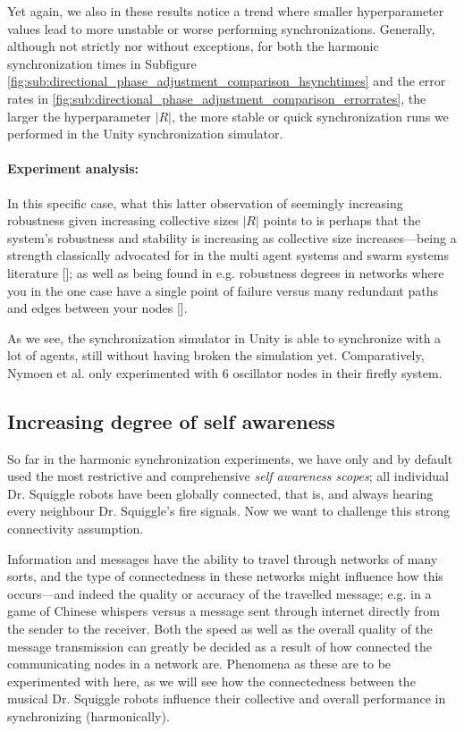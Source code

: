 		Yet again, we also in these results notice a trend where smaller hyperparameter values lead to more unstable or worse performing synchronizations. Generally, although not strictly nor without exceptions, for both the harmonic synchronization times in Subfigure \ref{fig:sub:directional_phase_adjustment_comparison_hsynchtimes} and the error rates in \ref{fig:sub:directional_phase_adjustment_comparison_errorrates}, the larger the hyperparameter $|R|$, the more stable or quick synchronization runs we performed in the Unity synchronization simulator. 
		
		\paragraph{Experiment analysis:\nl}
		
		In this specific case, what this latter observation of seemingly increasing robustness given increasing collective sizes $|R|$ points to is perhaps that the system's robustness and stability is increasing as collective size increases—being a strength classically advocated for in the multi agent systems and swarm systems literature []; as well as being found in e.g. robustness degrees in networks where you in the one case have a single point of failure versus many redundant paths and edges between your nodes [].
		
		As we see, the synchronization simulator in Unity is able to synchronize with a lot of agents, still without having broken the simulation yet. Comparatively, Nymoen et al. \cite{nymoen_synch} only experimented with 6 oscillator nodes in their firefly system.


	\subsection{Increasing degree of self awareness}
	\label{exp:phasesync:increasing_SA_deg}
	
	So far in the harmonic synchronization experiments, we have only and by default used the most restrictive and comprehensive \textit{self awareness scopes}; all individual Dr. Squiggle robots have been globally connected, that is, and always hearing every neighbour Dr. Squiggle's fire signals. Now we want to challenge this strong connectivity assumption.
	
	Information and messages have the ability to travel through networks of many sorts, and the type of connectedness in these networks might influence how this occurs—and indeed the quality or accuracy of the travelled message; e.g. in a game of Chinese whispers versus a message sent through internet directly from the sender to the receiver. Both the speed as well as the overall quality of the message transmission can greatly be decided as a result of how connected the communicating nodes in a network are. Phenomena as these are to be experimented with here, as we will see how the connectedness between the musical Dr. Squiggle robots influence their collective and overall performance in synchronizing (harmonically).
	

